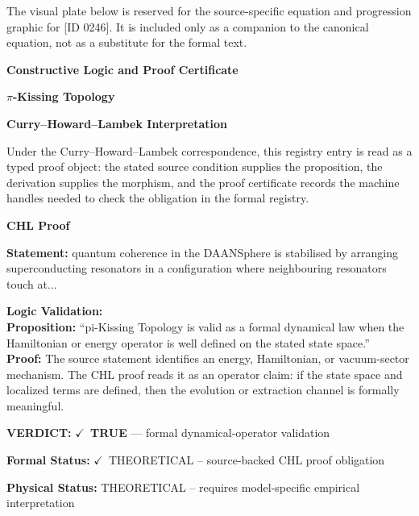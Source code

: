 \begingroup\footnotesize\sloppy
The visual plate below is reserved for the source-specific equation and progression graphic for [ID 0246]. It is included only as a companion to the canonical equation, not as a substitute for the formal text.
\par\endgroup
\ifTZPDarkEdition
{}
\fi

\clearpage
\begingroup\tzpsupportsetup
\noindent\textbf{\fontsize{10.8pt}{12.8pt}\selectfont [ID 0246] Constructive Logic and Proof Certificate}\par
\noindent\textbf{\fontsize{10pt}{12pt}\selectfont $\pi$-Kissing Topology}\par
\vspace{0.45em}
\begingroup
\footnotesize
\setlength{\parskip}{0.22em}
\setlength{\parindent}{0pt}
\noindent\textbf{Curry--Howard--Lambek Interpretation}\par
Under the Curry--Howard--Lambek correspondence, this registry entry is read as a typed proof
object: the stated source condition supplies the proposition, the derivation supplies the
morphism, and the proof certificate records the machine handles needed to check the obligation
in the formal registry.

\vspace{0.45em}
\noindent\textbf{CHL Proof}\par
\textbf{Statement:} quantum coherence in the DAANSphere is stabilised by arranging superconducting
resonators in a configuration where neighbouring resonators touch at...

\textbf{Logic Validation:}\\
\textbf{Proposition:} ``pi-Kissing Topology is valid as a formal dynamical law when the Hamiltonian or energy
operator is well defined on the stated state space.''\\
\textbf{Proof:} The source statement identifies an energy, Hamiltonian, or vacuum-sector mechanism. The
CHL proof reads it as an operator claim: if the state space and localized terms are
defined, then the evolution or extraction channel is formally meaningful.

\textbf{VERDICT:} \ensuremath{\checkmark}\ \textbf{TRUE} --- formal dynamical-operator validation

\textbf{Formal Status:} \ensuremath{\checkmark}\ THEORETICAL -- source-backed CHL proof obligation

\textbf{Physical Status:} THEORETICAL -- requires model-specific empirical interpretation
\par\vspace{0.45em}
\par
\ifTZPDarkEdition
{}
\fi
\endgroup
\endgroup
